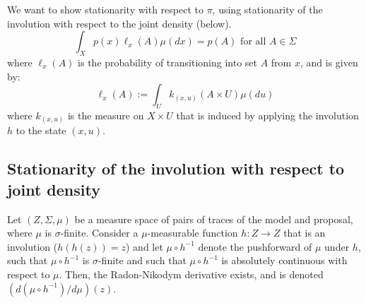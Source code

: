 \documentclass[twoside]{article}
\begin{document}
We want to show stationarity with respect to $\pi$, using stationarity of the involution with respect to the joint density (below).
\begin{equation}
\int_X p(x) \ell_x(A) \mu(dx) = p(A) \mbox{ for all } A \in \Sigma
\end{equation}
where $\ell_x(A)$ is the probability of transitioning into set $A$ from $x$, and is given by:
\begin{equation}
\ell_x(A) := \int_U k_{(x, u)}(A \times U) \mu(du)
\end{equation}
where $k_{(x, u)}$ is the measure on $X \times U$ that is induced by applying the involution $h$ to the state $(x, u)$.


\subsection{Stationarity of the involution with respect to joint density}
Let $(Z, \Sigma, \mu)$ be a measure space of pairs of traces of the model and proposal, where $\mu$ is $\sigma$-finite.
Consider a $\mu$-measurable function $h : Z \to Z$ that is an involution ($h(h(z)) = z$) and let $\mu \circ h^{-1}$ denote the pushforward of $\mu$ under $h$, such that $\mu \circ h^{-1}$ is $\sigma$-finite and such that $\mu \circ h^{-1}$ is absolutely continuous with respect to $\mu$.
Then, the Radon-Nikodym derivative exists, and is denoted $(d (\mu \circ h^{-1}) / d \mu)(z)$.
\end{document}
